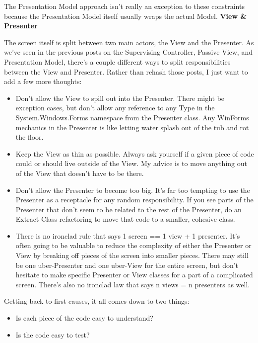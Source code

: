 \documentclass{article}
\begin{document}
{The Presentation Model approach isn't really an exception to these constraints because the Presentation Model itself usually wraps the actual Model.
\Large {\textbf{View \& Presenter}}

The screen itself is split between two main actors, the View and the Presenter.  As we've seen in the previous posts on the Supervising Controller, Passive View, and Presentation Model, there's a couple different ways to split responsibilities between the View and Presenter.  Rather than rehash those posts, I just want to add a few more thoughts:

\begin{itemize}
   \item  Don't allow the View to spill out into the Presenter.  There might be exception cases, but don't allow any reference to any Type in the System.Windows.Forms namespace from the Presenter class.  Any WinForms mechanics in the Presenter is like letting water splash out of the tub and rot the floor.   
 \item  Keep the View as thin as possible.  Always ask yourself if a given piece of code could or should live outside of the View.  My advice is to move anything out of the View that doesn't have to be there.  
 \item  Don't allow the Presenter to become too big.  It's far too tempting to use the Presenter as a receptacle for any random responsibility.  If you see parts of the Presenter that don't seem to be related to the rest of the Presenter, do an Extract Class refactoring to move that code to a smaller, cohesive class.  
 \item  There is no ironclad rule that says 1 screen == 1 view + 1 presenter.  It's often going to be valuable to reduce the complexity of either the Presenter or View by breaking off pieces of the screen into smaller pieces.  There may still be one uber-Presenter and one uber-View for the entire screen, but don't hesitate to make specific Presenter or View classes for a part of a complicated screen.  There's also no ironclad law that says n views = n presenters as well.  
\end{itemize}

Getting back to first causes, it all comes down to two things:
\begin{itemize}
   \item Is each piece of the code easy to understand?
   \item Is the code easy to test?
\end{itemize}	

}
\end{document}
